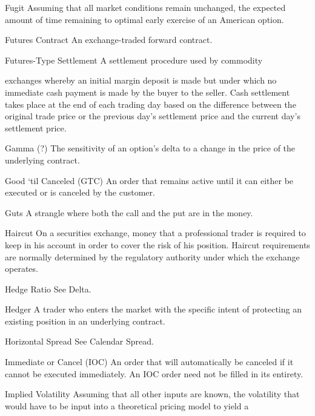 Fugit Assuming that all market conditions remain unchanged, the expected amount of time remaining to optimal early exercise of an American option.\par
Futures Contract An exchange-traded forward contract.\par
Futures-Type Settlement A settlement procedure used by commodity\par
exchanges whereby an initial margin deposit is made but under which no immediate cash payment is made by the buyer to the seller. Cash settlement takes place at the end of each trading day based on the difference between the original trade price or the previous day's settlement price and the current day's settlement price.\par
Gamma (?) The sensitivity of an option's delta to a change in the price of the underlying contract.\par
Good `til Canceled (GTC) An order that remains active until it can either be executed or is canceled by the customer.\par
Guts A strangle where both the call and the put are in the money.\par
Haircut On a securities exchange, money that a professional trader is required to keep in his account in order to cover the risk of his position. Haircut requirements are normally determined by the regulatory authority under which the exchange operates.\par
Hedge Ratio See Delta.\par
Hedger A trader who enters the market with the specific intent of protecting an existing position in an underlying contract.\par
Horizontal Spread See Calendar Spread.\par
Immediate or Cancel (IOC) An order that will automatically be canceled if it cannot be executed immediately. An IOC order need not be filled in its entirety.\par
Implied Volatility Assuming that all other inputs are known, the volatility that would have to be input into a theoretical pricing model to yield a\par


